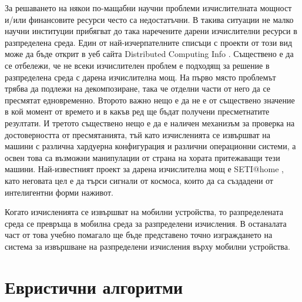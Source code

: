 \documentclass[book,14pt,oneside,openany]{memoir}
\begin{document}
За решаването на някои по-мащабни научни проблеми изчислителната мощност и/или финансовите ресурси често са недостатъчни. В такива ситуации не малко научни институции прибягват до така наречените дарени изчислителни ресурси в разпределена среда. Един от най-изчерпателните списъци с проекти от този вид може да бъде открит в уеб сайта Distributed Computing Info \cite{dcinfo}. Съществено е да се отбележи, че не всеки изчислителен проблем е подходящ за решение в разпределена среда с дарена изчислителна мощ. На първо място проблемът трябва да подлежи на декомпозиране, така че отделни части от него да се пресмятат едновременно. Второто важно нещо е да не е от съществено значение в кой момент от времето и в какъв ред ще бъдат получени пресметнатите резултати. И третото съществено нещо е да е наличен механизъм за проверка на достоверността от пресмятанията, тъй като изчисленията се извършват на машини с различна хардуерна конфигурация и различни операционни системи, а освен това са възможни манипулации от страна на хората притежаващи тези машини. Най-известният проект за дарена изчислителна мощ е SETI@home \cite{shuch}, като неговата цел е да търси сигнали от космоса, които да са създадени от интелигентни форми наживот.

Когато изчисленията се извършват на мобилни устройства, то разпределената среда се превръща в мобилна среда за разпределени изчисления. В останалата част от това учебно помагало ще бъде представено точно изграждането на система за извършване на разпределени изчисления върху мобилни устройства. 

\newpage
\chapter{Евристични алгоритми}
\label{chapter02}
\end{document}
